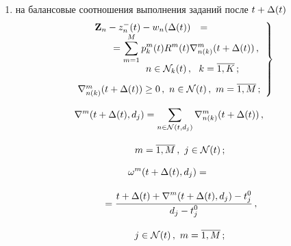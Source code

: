 \begin{multicols}{2}
\begin{enumerate}[(1)]
\item на балансовые соотношения выполнения заданий после $t \hm+ \Delta(t)$
\begin{equation}
\left.  
\begin{array}{rl}
\displaystyle\mathbf{Z}_{n} - z^-_{n}(t) - w_{n} (\Delta(t)) &={}\\
&\hspace*{-33mm}{}= \displaystyle\sum\limits_{m = 1}^M  p^m_k (t)  R^m( t ) \nabla_{n(k)} ^m (t + \Delta(t))\,,\\[9pt]
 &\hspace*{-20mm}n \in \mathcal{N}_k(t)\,, \ \ k = \overline {1, K}\,;\\[9pt]
&\hspace*{-45mm}\nabla _{n(k)}^m (t + \Delta(t)) \ge 0\,, \ n\in \mathcal{N}(t)\,, \ m = \overline {1,M}\,;
                    \end{array}
                    \right \} \!\!
                    \label{e18-mal}
\end{equation}

\vspace*{-12pt}

\noindent
\begin{multline}
\hspace*{-8mm}\nabla^m (t + \Delta(t), d_j)  = \sum\limits_{n \in \mathcal{N}(t, d_j)} \nabla _{n(k)} ^m (t + \Delta(t))\,,\\[9pt]
m = \overline {1, M}\,,\  j \in \mathcal{N}(t)\,;
                    \label{e19-mal}
                    \end{multline}
                    
                    \vspace*{-12pt}
                    
                    \noindent
\begin{multline} 
\hspace*{-8mm}\omega^m (t + \Delta(t), d_j ) = {}\\[9pt]
{}=\displaystyle\fr{ t + \Delta(t) + \nabla^{m}(t + \Delta(t), d_j) - t^0_j}{d_j - t^0_j }\,,\\[9pt]
j \in \mathcal{N}(t)\,, \ m = \overline {1,M}\,; 
                    \label{e20-mal}
                    \end{multline}


\end{enumerate}
\end{multicols}
